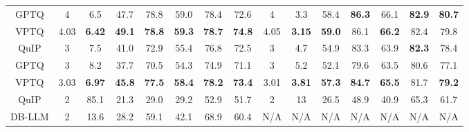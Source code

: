 \begin{table}[hbt!]
{\begin{tabular}{c|ccccccc|ccccccc}
GPTQ              & 4                    & 6.5                  & 47.7                 & 78.8                 & 59.0                 & 78.4                 & 72.6                 & 4                    & 3.3                  & 58.4                 & \textbf{86.3}                 & 66.1                 & \textbf{82.9}                 & \textbf{80.7}                 \\
VPTQ              & 4.03                 & \textbf{6.42}        & \textbf{49.1}        & \textbf{78.8}        & \textbf{59.3}        & \textbf{78.7}        & \textbf{74.8}        & 4.05                 & \textbf{3.15}        & \textbf{59.0}        & 86.1                 & \textbf{66.2}        & 82.4                 & 79.8                 \\ \hline
QuIP              & 3                    & 7.5                  & 41.0                 & 72.9                 & 55.4                 & 76.8                 & 72.5                 & 3                    & 4.7                  & 54.9                 & 83.3                 & 63.9                 & \textbf{82.3}                 & 78.4                 \\
GPTQ              & 3                    & 8.2                  & 37.7                 & 70.5                 & 54.3                 & 74.9                 & 71.1                 & 3                    & 5.2                  & 52.1                 & 79.6                 & 63.5                 & 80.6                 & 77.1                 \\
VPTQ              & 3.03                 & \textbf{6.97}        & \textbf{45.8}        & \textbf{77.5}        & \textbf{58.4}        & \textbf{78.2}        & \textbf{73.4}        & 3.01                 & \textbf{3.81}        & \textbf{57.3}        & \textbf{84.7}        & \textbf{65.5}        & 81.7                 & \textbf{79.2}        \\ \hline
QuIP              & 2                    & 85.1                 & 21.3                 & 29.0                 & 29.2                 & 52.9                 & 51.7                 & 2                    & 13                   & 26.5                 & 48.9                 & 40.9                 & 65.3                 & 61.7                 \\
DB-LLM            & 2                    & 13.6                 & 28.2                 & 59.1                 & 42.1                 & 68.9                 & 60.4                 & N/A                    & N/A                   & N/A                    & N/A                     & N/A                  & N/A                     & N/A                      \\

\end{tabular}}
\end{table}
